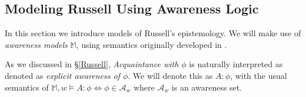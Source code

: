 


\subsection{Modeling Russell Using Awareness Logic}

In this section we introduce models of Russell's epistemology.  We
will make use of \emph{awareness models} $\mathbb{M}$, using semantics originally developed in \cite{fagin_belief_198}.

As we discussed in \S\ref{Russell}, \emph{Acquaintance with $\phi$} is
naturally interpreted as denoted as \emph{explicit awareness of
  $\phi$}.  We will denote this as $A:\phi$, with the usual
semantics of $\mathbb{M},w \models A:\phi \iff \phi \in \mathcal{A}_w$
where $\mathcal{A}_w$ is an awareness set.  


